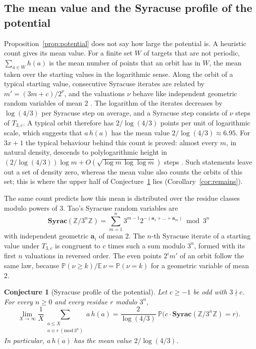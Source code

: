 \documentclass[12pt]{amsart}
\newtheorem{conjecture}{Conjecture}
\theoremstyle{definition}
\theoremstyle{remark}
\begin{document}
\subsection*{The mean value and the Syracuse profile of the potential}
Proposition~\ref{prop:potential} does not say how large the potential is. A heuristic count gives its mean value. For a finite set $W$ of targets that are not periodic, $\sum_{a\in W}h(a)$ is the mean number of points that an orbit has in $W$, the mean taken over the starting values in the logarithmic sense. Along the orbit of a typical starting value, consecutive Syracuse iterates are related by $m'=(3m+c)/2^{\nu}$, and the valuations $\nu$ behave like independent geometric random variables of mean $2$ \cite{Tao_2022,GGM_2025}. The logarithm of the iterates decreases by $\log(4/3)$ per Syracuse step on average, and a Syracuse step consists of $\nu$ steps of $T_{3,c}$. A typical orbit therefore has $2/\log(4/3)$ points per unit of logarithmic scale, which suggests that $a\,h(a)$ has the mean value $2/\log(4/3)\approx6.95$. For $3x+1$ the typical behaviour behind this count is proved: almost every $m$, in natural density, descends to polylogarithmic height in $(2/\log(4/3))\log m+O(\sqrt{\log m\,\log\log m})$ steps \cite{Shaik_2026}. Such statements leave out a set of density zero, whereas the mean value also counts the orbits of this set; this is where the upper half of Conjecture~\ref{conj:profile} lies (Corollary~\ref{cor:remains}).

The same count predicts how this mean is distributed over the residue classes modulo powers of $3$. Tao's Syracuse random variables \cite{Tao_2022} are
\[
\mathbf{Syrac}(\mathbb Z/3^n\mathbb Z)=\sum_{m=1}^{n}3^{m-1}2^{-(\mathbf a_1+\dots+\mathbf a_m)}\bmod 3^n
\]
with independent geometric $\mathbf a_i$ of mean $2$. The $n$-th Syracuse iterate of a starting value under $T_{3,c}$ is congruent to $c$ times such a sum modulo $3^n$, formed with its first $n$ valuations in reversed order. The even points $2^im'$ of an orbit follow the same law, because $\mathbb P(\nu\ge k)/\mathbb E\,\nu=\mathbb P(\nu=k)$ for a geometric variable of mean $2$.

\begin{conjecture}[Syracuse profile of the potential]
\label{conj:profile}
Let $c\ge-1$ be odd with $3\nmid c$. For every $n\ge0$ and every residue $r$ modulo $3^n$,
\[
\lim_{X\to\infty}\frac1X\sum_{\substack{a\le X\\ a\equiv r\ (\mathrm{mod}\ 3^n)}}a\,h(a)=\frac{2}{\log(4/3)}\ \mathbb P\bigl(c\cdot\mathbf{Syrac}(\mathbb Z/3^n\mathbb Z)=r\bigr).
\]
In particular, $a\,h(a)$ has the mean value $2/\log(4/3)$.
\end{conjecture}
\end{document}
